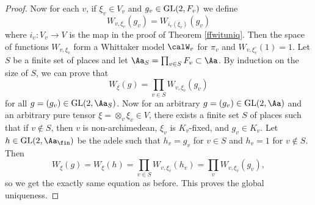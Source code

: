 \begin{proof}
Now for each $v$, if $\xi_v\in V_v$ and $g_v\in \mathrm{GL}(2, F_v)$ we define 
$$
W_{v, \xi_v}(g_v) = W_{i_v(\xi_v)}(g_v)
$$
where $i_v:V_v \to V$ is the map in the proof of Theorem \ref{ffwituniq}. 
Then the space of functions $W_{v, \xi_v}$ form a Whittaker model $\calW_v$ for $\pi_v$ and $W_{v, \xi_{v}^{\circ}}(1) = 1$. 
Let $S$ be a finite set of places and let $\Aa_{S} = \prod_{v\in S} F_{v} \subset \Aa$. By induction on the size of $S$, we can prove that 
$$
W_{\xi}(g) = \prod_{v\in S} W_{v, \xi_v}(g_v)
$$
for all $g = (g_v) \in \GL(2, \Aa_S)$. Now for an arbitrary $g = (g_v) \in \GL(2, \Aa)$ and an arbitrary pure tensor $\xi = \otimes_v \xi_v \in V$, there exists a finite set $S$ of places such that if $v\not\in S$, then $v$ is non-archimedean, $\xi_v$ is $K_v$-fixed,  and $g_v\in K_v$. 
Let $h \in \GL(2, \Aa_\fin)$ be the adele such that $h_v = g_v$ for $v\in S$ and $h_v = 1$ for $v\not\in S$. 
Then 
$$
W_{\xi}(g) = W_{\xi}(h) = \prod_{v\in S} W_{v, \xi_v}(h_v) = \prod_{v} W_{v, \xi_v}(g_v), 
$$
so we get the exactly same equation as before. This proves the global uniqueness. 
\end{proof}

